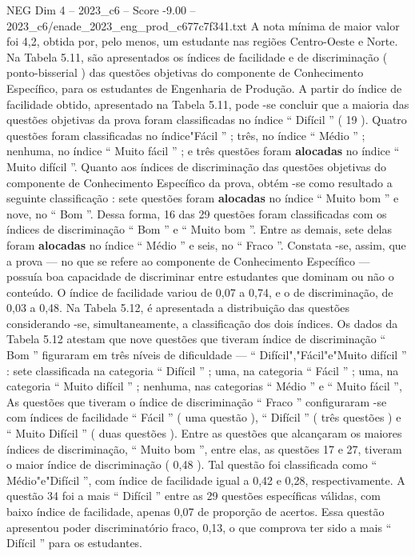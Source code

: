 \begin{textsample}{NEG Dim 4 – 2023\_c6 – Score -9.00 – 2023\_c6/enade\_2023\_eng\_prod\_c677c7f341.txt}
A nota mínima de maior valor foi 4,2, obtida por, pelo menos, um estudante nas regiões Centro-Oeste e Norte.
Na Tabela 5.11, são apresentados os índices de facilidade e de discriminação ( ponto-bisserial ) das questões objetivas do componente de Conhecimento Específico, para os estudantes de Engenharia de Produção.
A partir do índice de facilidade obtido, apresentado na Tabela 5.11, pode -se concluir que a maioria das questões objetivas da prova foram classificadas no índice “ Difícil ” ( 19 ).
Quatro questões foram classificadas no índice"Fácil ” ; três, no índice “ Médio ” ; nenhuma, no índice “ Muito fácil ” ; e três questões foram \textbf{alocadas} no índice “ Muito difícil ”.
Quanto aos índices de discriminação das questões objetivas do componente de Conhecimento Específico da prova, obtém -se como resultado a seguinte classificação : sete questões foram \textbf{alocadas} no índice “ Muito bom ” e nove, no “ Bom ”.
Dessa forma, 16 das 29 questões foram classificadas com os índices de discriminação “ Bom ” e “ Muito bom ”.
Entre as demais, sete delas foram \textbf{alocadas} no índice “ Médio ” e seis, no “ Fraco ”.
Constata -se, assim, que a prova — no que se refere ao componente de Conhecimento Específico — possuía boa capacidade de discriminar entre estudantes que dominam ou não o conteúdo.
O índice de facilidade variou de 0,07 a 0,74, e o de discriminação, de 0,03 a 0,48.
Na Tabela 5.12, é apresentada a distribuição das questões considerando -se, simultaneamente, a classificação dos dois índices.
Os dados da Tabela 5.12 atestam que nove questões que tiveram índice de discriminação “ Bom ” figuraram em três níveis de dificuldade — “ Difícil","Fácil"e"Muito difícil ” : sete classificada na categoria “ Difícil ” ; uma, na categoria “ Fácil ” ; uma, na categoria “ Muito difícil ” ; nenhuma, nas categorias “ Médio ” e “ Muito fácil ”, As questões que tiveram o índice de discriminação “ Fraco ” configuraram -se com índices de facilidade “ Fácil ” ( uma questão ), “ Difícil ” ( três questões ) e “ Muito Difícil ” ( duas questões ).
Entre as questões que alcançaram os maiores índices de discriminação, “ Muito bom ”, entre elas, as questões 17 e 27, tiveram o maior índice de discriminação ( 0,48 ).
Tal questão foi classificada como “ Médio"e"Difícil ”, com índice de facilidade igual a 0,42 e 0,28, respectivamente.
A questão 34 foi a mais “ Difícil ” entre as 29 questões específicas válidas, com baixo índice de facilidade, apenas 0,07 de proporção de acertos.
Essa questão apresentou poder discriminatório fraco, 0,13, o que comprova ter sido a mais “ Difícil ” para os estudantes.

\end{textsample}

